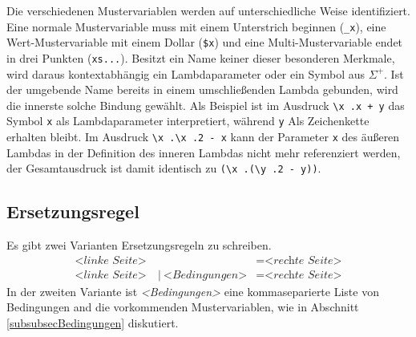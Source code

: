 Die verschiedenen Mustervariablen werden auf unterschiedliche Weise identifiziert. Eine normale Mustervariable muss mit einem Unterstrich beginnen (\verb|_x|), eine Wert-Mustervariable mit einem Dollar (\verb|$x|) und eine Multi-Mustervariable endet in drei Punkten (\verb|xs...|). Besitzt ein Name keiner dieser besonderen Merkmale, wird daraus kontextabhängig ein Lambdaparameter oder ein Symbol aus $\Sigma^+$. Ist der umgebende Name bereits in einem umschließenden Lambda gebunden, wird die innerste solche Bindung gewählt. Als Beispiel ist im Ausdruck \verb|\x .x + y| das Symbol \verb|x| als Lambdaparameter interpretiert, während \verb|y| Als Zeichenkette erhalten bleibt.
Im Ausdruck \verb|\x .\x .2 - x| kann der Parameter \verb|x| des äußeren Lambdas in der Definition des inneren Lambdas nicht mehr referenziert werden, der Gesamtausdruck ist damit identisch zu \verb|(\x .(\y .2 - y))|.


\subsection{Ersetzungsregel}
Es gibt zwei Varianten Ersetzungsregeln zu schreiben.
\begin{align*}
	~&~&~&~&\textit{<linke Seite>}&~ ~                       &= \textit{<rechte Seite>}&~&~&~&~\\
	~&~&~&~&\textit{<linke Seite>}&~|~\textit{<Bedingungen>} &= \textit{<rechte Seite>}&~&~&~&~
\end{align*}
In der zweiten Variante ist \textit{<Bedingungen>} eine kommaseparierte Liste von Bedingungen and die vorkommenden Mustervariablen, wie in Abschnitt \ref{subsubsecBedingungen} diskutiert. 




